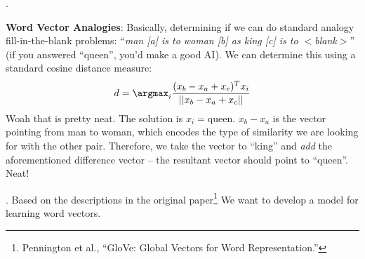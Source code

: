 \documentclass[11pt]{article}
\newcommand\myspace[1][]{\vspace{#1\bigskipamount}}
\newcommand\p{\Needspace{10\baselineskip} \noindent}
\begin{document}
\myspace
\p {}. 
\begin{compactitem}
	\item \textbf{Word Vector Analogies}: Basically, determining if we can do standard analogy fill-in-the-blank problems: ``\textit{man [a] is to woman [b] as king [c] is to $<$blank$>$}'' (if you answered ``queen'', you'd make a good AI). We can determine this using a standard cosine distance measure:
	\begin{align}
	d = \argmax_i \frac{(x_b - x_a + x_c)^T x_i}{ || x_b - x_a + x_c ||}
	\end{align}
	Woah that is pretty neat. The solution is $x_i = \text{queen}$. $x_b - x_a$ is the vector pointing from man to woman, which encodes the type of similarity we are looking for with the other pair. Therefore, we take the vector to ``king'' and \textit{add} the aforementioned difference vector -- the resultant vector should point to ``queen''. Neat!
\end{compactitem}

\myspace
\p {}. Based on the descriptions in the original paper\footnote{Pennington et al., ``GloVe: Global Vectors for Word Representation.''} We want to develop a model for learning word vectors. 
\end{document}
